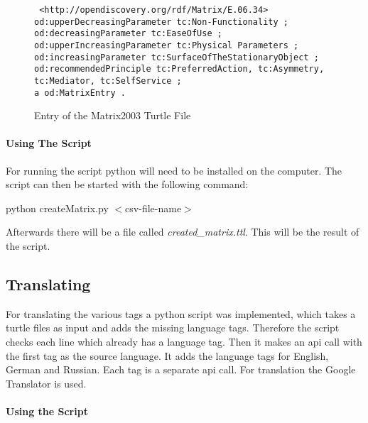 \begin{figure}[H]
    \centering
    \begin{code}\tt
        <http://opendiscovery.org/rdf/Matrix/E.06.34>\\
        \> od:upperDecreasingParameter tc:Non-Functionality ;\\
        \> od:decreasingParameter tc:EaseOfUse ;\\
        \> od:upperIncreasingParameter tc:Physical Parameters ;\\
        \> od:increasingParameter tc:SurfaceOfTheStationaryObject ;\\
        \> od:recommendedPrinciple tc:PreferredAction, tc:Asymmetry, \\
        \> \> \> tc:Mediator, tc:SelfService ;\\
        \> a od:MatrixEntry .
    \end{code}
    \caption{Entry of the Matrix2003 Turtle File}
\end{figure}

\paragraph{Using The Script}

For running the script python will need to be installed on the computer.
The script can then be started with the following command:

\begin{center}
    python createMatrix.py $<$csv-file-name$>$
\end{center}

Afterwards there will be a file called \textit{created\_matrix.ttl}.
This will be the result of the script.


\subsection{Translating}

For translating the various tags a python script was implemented, which takes a turtle files as input and adds the missing language tags.
Therefore the script checks each line which already has a language tag. 
Then it makes an api call with the first tag as the source language.
It adds the language tags for English, German and Russian. 
Each tag is a separate api call.
For translation the Google Translator is used.

\paragraph{Using the Script}

